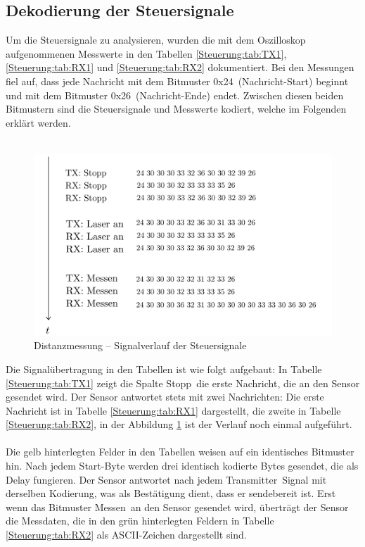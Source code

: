 \subsection{Dekodierung der Steuersignale}
\label{Distanzmessung:Kodierung}
Um die Steuersignale zu analysieren, wurden die mit dem Oszilloskop aufgenommenen Messwerte in den Tabellen \ref{Steuerung:tab:TX1}, \ref{Steuerung:tab:RX1} und \ref{Steuerung:tab:RX2} dokumentiert. Bei den Messungen fiel auf, dass jede Nachricht mit dem Bitmuster \frqq 0x24\flqq\ (Nachricht-Start) beginnt und mit dem Bitmuster \frqq 0x26\flqq\ (Nachricht-Ende) endet. Zwischen diesen beiden Bitmustern sind die Steuersignale und Messwerte kodiert, welche im Folgenden erklärt werden.\\
\
\pagebreak[1]
\begin{figure}[!ht]
	\begin{center}
		\includegraphics[width=1\textwidth]{img/2_sen/dis_parkside_signalverlauf.png}
		\caption{Distanzmessung – Signalverlauf der Steuersignale}
		\label{Kodierung:pic:signalverlauf}
	\end{center}
\end{figure}
\pagebreak[4]
Die Signalübertragung in den Tabellen ist wie folgt aufgebaut: In Tabelle \ref{Steuerung:tab:TX1} zeigt die Spalte \frqq Stopp\flqq\ die erste Nachricht, die an den Sensor gesendet wird. Der Sensor antwortet stets mit zwei Nachrichten: Die erste Nachricht ist in Tabelle \ref{Steuerung:tab:RX1} dargestellt, die zweite in Tabelle \ref{Steuerung:tab:RX2}, in der Abbildung \ref{Kodierung:pic:signalverlauf} ist der Verlauf noch einmal aufgeführt.\\ \ \\
Die gelb hinterlegten Felder in den Tabellen weisen auf ein identisches Bitmuster hin. Nach jedem Start-Byte werden drei identisch kodierte Bytes gesendet, die als Delay fungieren. Der Sensor antwortet nach jedem \frqq Transmitter\flqq\ Signal mit derselben Kodierung, was als Bestätigung dient, dass er sendebereit ist. Erst wenn das Bitmuster \frqq Messen\flqq\ an den Sensor gesendet wird, überträgt der Sensor die Messdaten, die in den grün hinterlegten Feldern in Tabelle \ref{Steuerung:tab:RX2} als ASCII-Zeichen dargestellt sind.


